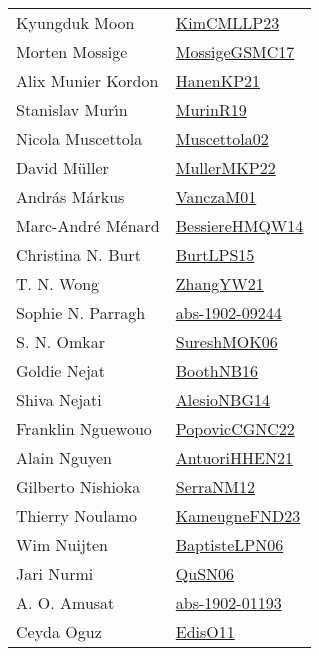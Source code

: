 {\begin{longtable}{p{4cm}p{20cm}}
Kyungduk Moon & \href{papers/KimCMLLP23.pdf}{KimCMLLP23}\cite{KimCMLLP23} \\
Morten Mossige & \href{papers/MossigeGSMC17.pdf}{MossigeGSMC17}\cite{MossigeGSMC17} \\
Alix Munier Kordon & \href{papers/HanenKP21.pdf}{HanenKP21}\cite{HanenKP21} \\
Stanislav Mur{\'{\i}}n & \href{papers/MurinR19.pdf}{MurinR19}\cite{MurinR19} \\
Nicola Muscettola & \href{papers/Muscettola02.pdf}{Muscettola02}\cite{Muscettola02} \\
David M{\"{u}}ller & \href{articles/MullerMKP22.pdf}{MullerMKP22}\cite{MullerMKP22} \\
Andr{\'{a}}s M{\'{a}}rkus & \href{papers/VanczaM01.pdf}{VanczaM01}\cite{VanczaM01} \\
Marc{-}Andr{\'{e}} M{\'{e}}nard & \href{papers/BessiereHMQW14.pdf}{BessiereHMQW14}\cite{BessiereHMQW14} \\
Christina N. Burt & \href{papers/BurtLPS15.pdf}{BurtLPS15}\cite{BurtLPS15} \\
T. N. Wong & \href{articles/ZhangYW21.pdf}{ZhangYW21}\cite{ZhangYW21} \\
Sophie N. Parragh & \href{articles/abs-1902-09244.pdf}{abs-1902-09244}\cite{abs-1902-09244} \\
S. N. Omkar & \href{}{SureshMOK06}\cite{SureshMOK06} \\
Goldie Nejat & \href{papers/BoothNB16.pdf}{BoothNB16}\cite{BoothNB16} \\
Shiva Nejati & \href{papers/AlesioNBG14.pdf}{AlesioNBG14}\cite{AlesioNBG14} \\
Franklin Nguewouo & \href{papers/PopovicCGNC22.pdf}{PopovicCGNC22}\cite{PopovicCGNC22} \\
Alain Nguyen & \href{papers/AntuoriHHEN21.pdf}{AntuoriHHEN21}\cite{AntuoriHHEN21} \\
Gilberto Nishioka & \href{papers/SerraNM12.pdf}{SerraNM12}\cite{SerraNM12} \\
Thierry Noulamo & \href{papers/KameugneFND23.pdf}{KameugneFND23}\cite{KameugneFND23} \\
Wim Nuijten & \href{}{BaptisteLPN06}\cite{BaptisteLPN06} \\
Jari Nurmi & \href{papers/QuSN06.pdf}{QuSN06}\cite{QuSN06} \\
A. O. Amusat & \href{articles/abs-1902-01193.pdf}{abs-1902-01193}\cite{abs-1902-01193} \\
Ceyda Oguz & \href{papers/EdisO11.pdf}{EdisO11}\cite{EdisO11} \\

\end{longtable}}
